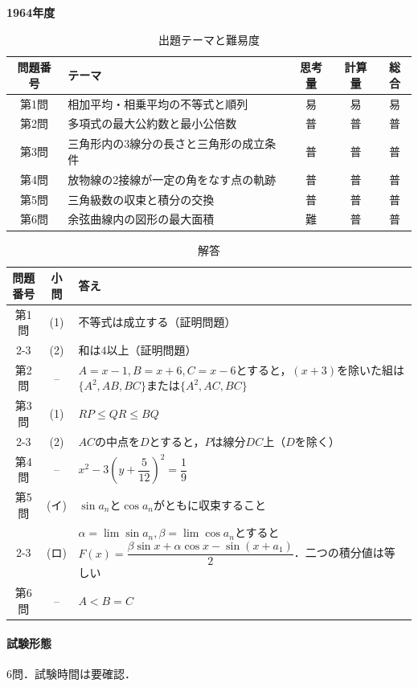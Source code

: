 \documentclass[../../main.tex]{subfiles}
\begin{document}
\begin{center}
  {\fontsize{48pt}{58pt}\selectfont \textbf{1964}\normalsize\textbf{年度}}
\end{center}

\begin{table}[htb]
  \centering
  \caption{出題テーマと難易度}
  \begin{tabular}{|c|p{6.2cm}|c|c|c|}
    \hline
    \textbf{問題番号} & \textbf{テーマ} & \textbf{思考量} & \textbf{計算量} & \textbf{総合} \\
    \hline
    第1問 & 相加平均・相乗平均の不等式と順列 & 易 & 易 & 易 \\
    \hline
    第2問 & 多項式の最大公約数と最小公倍数 & 普 & 普 & 普 \\
    \hline
    第3問 & 三角形内の3線分の長さと三角形の成立条件 & 普 & 普 & 普 \\
    \hline
    第4問 & 放物線の2接線が一定の角をなす点の軌跡 & 普 & 普 & 普 \\
    \hline
    第5問 & 三角級数の収束と積分の交換 & 普 & 普 & 普 \\
    \hline
    第6問 & 余弦曲線内の図形の最大面積 & 難 & 普 & 普 \\
    \hline
  \end{tabular}
\end{table}

\begin{table}[htb]
  \centering
  \caption{解答}
  \renewcommand{\arraystretch}{1.4}
  \begin{tabular}{|c|c|p{9cm}|}
    \hline
    \textbf{問題番号} & \textbf{小問} & \textbf{答え} \\
    \hline
    第1問 & (1) & 不等式は成立する（証明問題） \\
    \cline{2-3}
    & (2) & 和は$4$以上（証明問題） \\
    \hline
    第2問 & -- & $A=x-1,B=x+6,C=x-6$とすると，$(x+3)$を除いた組は$\{A^2,AB,BC\}$または$\{A^2,AC,BC\}$ \\
    \hline
    第3問 & (1) & $RP\le QR\le BQ$ \\
    \cline{2-3}
    & (2) & $AC$の中点を$D$とすると，$P$は線分$DC$上（$D$を除く） \\
    \hline
    第4問 & -- & $x^2-3\left(y+\dfrac{5}{12}\right)^2=\dfrac{1}{9}$ \\
    \hline
    第5問 & (イ) & $\sin a_n$と$\cos a_n$がともに収束すること \\
    \cline{2-3}
    & (ロ) & $\alpha=\lim\sin a_n,\beta=\lim\cos a_n$とすると$F(x)=\dfrac{\beta\sin x+\alpha\cos x-\sin(x+a_1)}{2}$．二つの積分値は等しい \\
    \hline
    第6問 & -- & $A<B=C$ \\
    \hline
  \end{tabular}
\end{table}

\paragraph{試験形態}
6問．試験時間は要確認．
\end{document}
